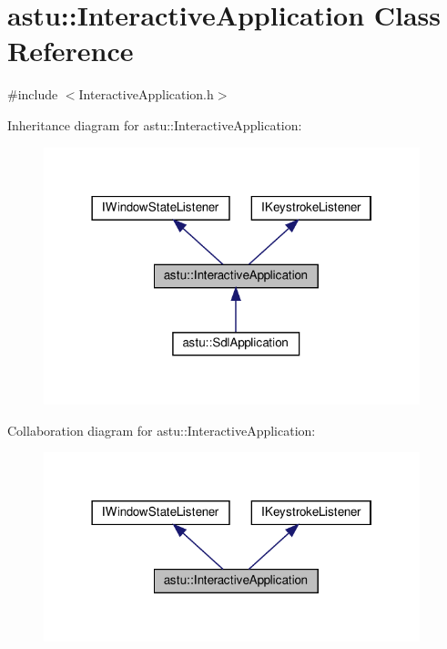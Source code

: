 \hypertarget{classastu_1_1InteractiveApplication}{}\section{astu\+:\+:Interactive\+Application Class Reference}
\label{classastu_1_1InteractiveApplication}


{\ttfamily \#include $<$Interactive\+Application.\+h$>$}



Inheritance diagram for astu\+:\+:Interactive\+Application\+:\nopagebreak
\begin{figure}[H]
\begin{center}
\leavevmode
\includegraphics[width=310pt]{classastu_1_1InteractiveApplication__inherit__graph}
\end{center}
\end{figure}


Collaboration diagram for astu\+:\+:Interactive\+Application\+:\nopagebreak
\begin{figure}[H]
\begin{center}
\leavevmode
\includegraphics[width=310pt]{classastu_1_1InteractiveApplication__coll__graph}
\end{center}
\end{figure}
